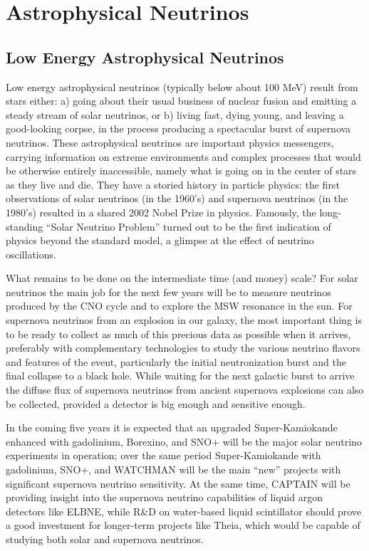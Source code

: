 \section{Astrophysical Neutrinos}
\label{sec:Astrophysical}

\subsection{Low Energy Astrophysical Neutrinos}
\label{sec:Astrophysical_low}

Low energy astrophysical neutrinos (typically below about 100 MeV)
result from stars either: a) going about their usual business of
nuclear fusion and emitting a steady stream of solar neutrinos, or b)
living fast, dying young, and leaving a good-looking corpse, in the
process producing a spectacular burst of supernova neutrinos. These
astrophysical neutrinos are important physics messengers, carrying
information on extreme environments and complex processes that would
be otherwise entirely inaccessible, namely what is going on in the
center of stars as they live and die. They have a storied history in
particle physics: the first observations of solar neutrinos (in the
1960's) and supernova neutrinos (in the 1980's) resulted in a shared
2002 Nobel Prize in physics. Famously, the long-standing ``Solar
Neutrino Problem'' turned out to be the first indication of physics
beyond the standard model, a glimpse at the effect of neutrino
oscillations.

What remains to be done on the intermediate time (and money) scale?
For solar neutrinos the main job for the next few years will be to
measure neutrinos produced by the CNO cycle and to explore the MSW
resonance in the sun. For supernova neutrinos from an explosion in our
galaxy, the most important thing is to be ready to collect as much of
this precious data as possible when it arrives, preferably with
complementary technologies to study the various neutrino flavors
and features of the event, particularly the initial neutronization
burst and the final collapse to a black hole. While waiting for the
next galactic burst to arrive the diffuse flux of supernova neutrinos
from ancient supernova explosions can also be collected, provided a
detector is big enough and sensitive enough.

In the coming five years it is expected that an upgraded
Super-Kamiokande enhanced with gadolinium, Borexino, and SNO+ will be
the major solar neutrino experiments in operation; over the same
period Super-Kamiokande with gadolinium, SNO+, and WATCHMAN will be
the main ``new'' projects with significant supernova neutrino
sensitivity. At the same time, CAPTAIN will be providing insight into
the supernova neutrino capabilities of liquid argon detectors like
ELBNE, while R\&D on water-based liquid scintillator should prove a
good investment for longer-term projects like Theia, which would be
capable of studying both solar and supernova neutrinos.

